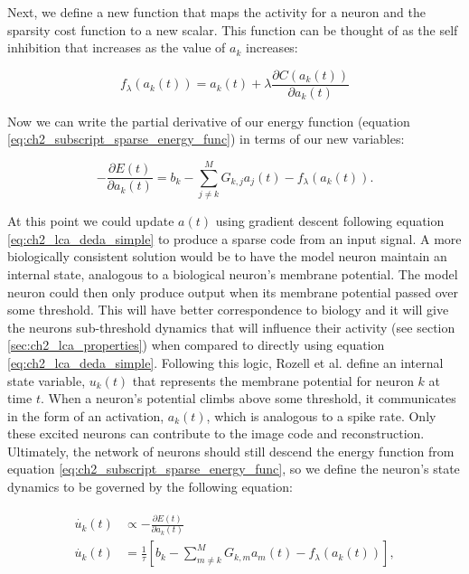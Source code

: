 Next, we define a new function that maps the activity for a neuron and the sparsity cost function to a new scalar. This function can be thought of as the self inhibition that increases as the value of $a_{k}$ increases:

\begin{equation}\label{eq:ch2_hopfield_t_func}
  f_{\lambda}(a_{k}(t)) = a_{k}(t) + \lambda \frac{\partial C(a_{k}(t))}{\partial a_{k}(t)}
\end{equation}

Now we can write the partial derivative of our energy function (equation \eqref{eq:ch2_subscript_sparse_energy_func}) in terms of our new variables:

\begin{equation}\label{eq:ch2_lca_deda_simple}
    - \frac{\partial E(t)}{\partial a_{k}(t)} =
    b_{k} -
    \sum\limits_{j \neq k}^{M} G_{k,j} a_{j}(t) -
    f_{\lambda}(a_{k}(t)).
\end{equation}

At this point we could update $a(t)$ using gradient descent following equation \eqref{eq:ch2_lca_deda_simple} to produce a sparse code from an input signal. A more biologically consistent solution would be to have the model neuron maintain an internal state, analogous to a biological neuron's membrane potential. The model neuron could then only produce output when its membrane potential passed over some threshold. This will have better correspondence to biology and it will give the neurons sub-threshold dynamics that will influence their activity (see section \ref{sec:ch2_lca_properties}) when compared to directly using equation \ref{eq:ch2_lca_deda_simple}. Following this logic, Rozell et al. \citeyearpar{rozell2008sparse} define an internal state variable, $u_{k}(t)$ that represents the membrane potential for neuron $k$ at time $t$. When a neuron's potential climbs above some threshold, it communicates in the form of an activation, $a_{k}(t)$, which is analogous to a spike rate. Only these excited neurons can contribute to the image code and reconstruction. Ultimately, the network of neurons should still descend the energy function from equation \eqref{eq:ch2_subscript_sparse_energy_func}, so we define the neuron's state dynamics to be governed by the following equation:

\begin{align}\label{eq:ch2_u_dot}
\begin{split}
    \dot{u_{k}}(t) &\propto - \frac{\partial E(t)} {\partial a_{k}(t)} \\
    \dot{u_{k}}(t) &= \frac{1}{\tau} \left[b_{k} - \sum_{m \neq k}^{M}G_{k,m}a_{m}(t) - f_{\lambda}(a_{k}(t)) \right],
\end{split}
\end{align}

